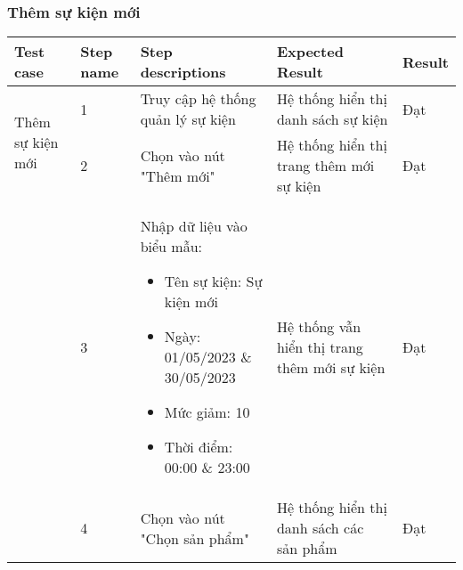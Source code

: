 \subsubsection{Thêm sự kiện mới}
{
    \setlength\extrarowheight{6pt}
    \begin{longtable}{| p{2.5cm}| p{1cm}| p{5.5cm}| p{4.5cm} | p{1.5cm} |}
        \hline
        \textbf{Test case}                           & \textbf{Step name}                           & \textbf{Step descriptions}                                & \textbf{Expected Result}                                             & \textbf{Result} \\
        \hline
        \multirow[t]{2}{2.5cm}{Thêm sự kiện mới}     & 1                                            & Truy cập hệ thống quản lý sự kiện                         & Hệ thống hiển thị danh sách sự kiện                                  & Đạt             \\
        \cline{2-5}
                                                     & 2                                            & Chọn vào nút "Thêm mới"                                   & Hệ thống hiển thị trang thêm mới sự kiện                             & Đạt             \\
        \cline{2-5}
                                                     & 3                                            & Nhập dữ liệu vào biểu mẫu:
        \begin{itemize}
            \item Tên sự kiện: Sự kiện mới
            \item Ngày: 01/05/2023 \& 30/05/2023
            \item Mức giảm: 10
            \item Thời điểm: 00:00 \& 23:00
        \end{itemize}         & Hệ thống vẫn hiển thị trang thêm mới sự kiện & Đạt                                                                                                                                                                       \\
        \cline{2-5}
                                                     & 4                                            & Chọn vào nút "Chọn sản phẩm"                              & Hệ thống hiển thị danh sách các sản phẩm                             & Đạt             \\
        \cline{2-5}

\end{longtable}}
